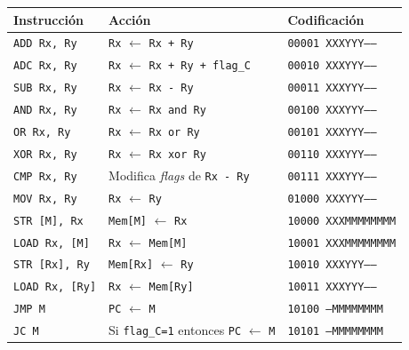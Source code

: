 \documentclass[a4paper,11pt]{article}
\begin{document}
\begin{center}
\begin{tabular}{l|l|l}
Instrucción            & Acción                                                             & Codificación               \\
\hline
\texttt{ADD  Rx, Ry}   & \texttt{Rx} $\leftarrow$ \texttt{Rx + Ry}                          & \texttt{00001 XXXYYY-----} \\  %
\texttt{ADC  Rx, Ry}   & \texttt{Rx} $\leftarrow$ \texttt{Rx + Ry + flag\_C}                & \texttt{00010 XXXYYY-----} \\  %
\texttt{SUB  Rx, Ry}   & \texttt{Rx} $\leftarrow$ \texttt{Rx - Ry}                          & \texttt{00011 XXXYYY-----} \\  %
\texttt{AND  Rx, Ry}   & \texttt{Rx} $\leftarrow$ \texttt{Rx and Ry}                        & \texttt{00100 XXXYYY-----} \\  %
\texttt{OR   Rx, Ry}   & \texttt{Rx} $\leftarrow$ \texttt{Rx or Ry}                         & \texttt{00101 XXXYYY-----} \\  %
\texttt{XOR  Rx, Ry}   & \texttt{Rx} $\leftarrow$ \texttt{Rx xor Ry}                        & \texttt{00110 XXXYYY-----} \\  %
\texttt{CMP  Rx, Ry}   & Modifica \emph{flags} de \texttt{Rx - Ry}                          & \texttt{00111 XXXYYY-----} \\  %
\texttt{MOV  Rx, Ry}   & \texttt{Rx} $\leftarrow$ \texttt{Ry}                               & \texttt{01000 XXXYYY-----} \\  %
\hline
\texttt{STR  [M], Rx}  & \texttt{Mem[M]} $\leftarrow$ \texttt{Rx}                           & \texttt{10000 XXXMMMMMMMM} \\  %
\texttt{LOAD Rx, [M]}  & \texttt{Rx} $\leftarrow$ \texttt{Mem[M]}                           & \texttt{10001 XXXMMMMMMMM} \\  %
\texttt{STR  [Rx], Ry} & \texttt{Mem[Rx]} $\leftarrow$ \texttt{Ry}                          & \texttt{10010 XXXYYY-----} \\  %
\texttt{LOAD Rx, [Ry]} & \texttt{Rx} $\leftarrow$ \texttt{Mem[Ry]}                          & \texttt{10011 XXXYYY-----} \\  %
\hline
\texttt{JMP M}         & \texttt{PC} $\leftarrow$ \texttt{M}                                & \texttt{10100 ---MMMMMMMM} \\  %
\texttt{JC M}          & Si \texttt{flag\_C=1} entonces \texttt{PC} $\leftarrow$ \texttt{M} & \texttt{10101 ---MMMMMMMM} \\  %

\end{tabular}
\end{center}
\end{document}
